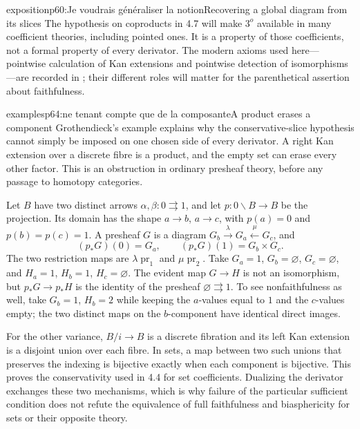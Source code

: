 \begin{dcomment}{exposition}{p60:Je voudrais généraliser la notion}{Recovering a global diagram from its slices}
The hypothesis on coproducts in 4.7 will make $3^o$ available in many coefficient theories, including pointed ones. It is a property of those coefficients, not a formal property of every derivator. The modern axioms used here---pointwise calculation of Kan extensions and pointwise detection of isomorphisms---are recorded in \citet[Definition 1.5]{Groth2013}; their different roles will matter for the parenthetical assertion about faithfulness.
\end{dcomment}

\begin{dcomment}{examples}{p64:ne tenant compte que de la composante}{A product erases a component}
Grothendieck's example explains why the conservative-slice hypothesis cannot simply be imposed on one chosen side of every derivator. A right Kan extension over a discrete fibre is a product, and the empty set can erase every other factor. This is an obstruction in ordinary presheaf theory, before any passage to homotopy categories.

Let $B$ have two distinct arrows $\alpha,\beta:0\rightrightarrows1$, and let $p:0\backslash B\to B$ be the projection. Its domain has the shape $a\to b$, $a\to c$, with $p(a)=0$ and $p(b)=p(c)=1$. A presheaf $G$ is a diagram $G_b\xrightarrow{\lambda}G_a\xleftarrow{\mu}G_c$, and
\[
 (p_*G)(0)=G_a,\qquad
 (p_*G)(1)=G_b\times G_c.
\]
The two restriction maps are $\lambda\operatorname{pr}_1$ and $\mu\operatorname{pr}_2$. Take $G_a=1$, $G_b=\varnothing$, $G_c=\varnothing$, and $H_a=1$, $H_b=1$, $H_c=\varnothing$. The evident map $G\to H$ is not an isomorphism, but $p_*G\to p_*H$ is the identity of the presheaf $\varnothing\rightrightarrows1$. To see nonfaithfulness as well, take $G_b=1$, $H_b=2$ while keeping the $a$-values equal to $1$ and the $c$-values empty; the two distinct maps on the $b$-component have identical direct images.

For the other variance, $B/i\to B$ is a discrete fibration and its left Kan extension is a disjoint union over each fibre. In sets, a map between two such unions that preserves the indexing is bijective exactly when each component is bijective. This proves the conservativity used in 4.4 for set coefficients. Dualizing the derivator exchanges these two mechanisms, which is why failure of the particular sufficient condition does not refute the equivalence of full faithfulness and biasphericity for sets or their opposite theory.
\end{dcomment}

